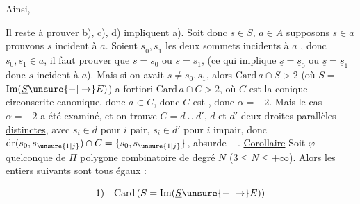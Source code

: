 \deleted{[\unsure{Mais} b) signifie que $\underline v s_{\unsure{0}}=s_{\unsure{0}}$ implique $\underline v\underline s_0=\underline s_0$]}
Ainsi,


Il reste à prouver b), c), d) impliquent a).
Soit donc $\underline s\in\underline S$, $\underline a\in\underline A$ supposons $s\in a$
prouvons $\underline s$ incident à $\underline a$. Soient $\underline s_0,\underline s_1$ les
deux sommets  incidents à $\underline a$ , donc $s_0,s_1\in a$,
 il faut prouver que  $s=s_0$ ou $s=s_1$,
(ce qui implique $\underline s=\underline s_0$ ou $\underline s=\underline s_1$ donc
$\underline s$ incident à $\underline a$).  Mais si on avait
$s\ne s_0,s_1$, alors $\mathrm{Card}\,a\cap S>2$ (où $S=$
$\mathrm{Im}(\underline S\unsure{-|\to}E)$) a fortiori $\mathrm{Card}\,a\cap C>2$,
où $C$ est la conique circonscrite canonique.
donc $a\subset C$, donc $C$ est  , donc
$\alpha=-2$. Mais le cas $\alpha=-2$ a été examiné,
et on trouve $C=d\cup d'$, $d$ et $d'$ deux
droites parallèles \uline{distinctes}, avec $s_i\in d$
pour $i$ pair, $s_i\in d'$ pour $i$ impair, donc
$\mathrm{dr}(s_0,s_{\unsure{1|j}})\cap C=\{s_0,s_{\unsure{1|j}}\}$, absurde -- .
\uline{Corollaire} Soit $\varphi$  quelconque de 
$\Pi$ polygone combinatoire de degré $N$
($3\leq N\leq+\infty$).  Alors les entiers suivants
sont tous égaux :

\[
\text{1)}\quad\mathrm{Card}\,(S=\mathrm{Im}(\underline S\unsure{-|\to}E))
\]

